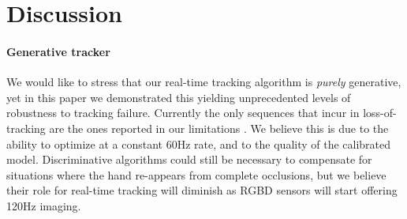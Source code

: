 \section{Discussion}
\label{sec:discussion}




\paragraph{Generative tracker}
We would like to stress that our real-time tracking algorithm is \emph{purely} generative, yet in this paper we demonstrated this yielding unprecedented levels of robustness to tracking failure. Currently the only sequences that incur in loss-of-tracking are the ones reported in our limitations \VideoLimit{}. We believe this is due to the ability to optimize at a constant 60Hz rate, and to the quality of the calibrated model. Discriminative algorithms could still be necessary to compensate for situations where the hand re-appears from complete occlusions, but we believe their role for real-time tracking will diminish as RGBD sensors will start offering 120Hz imaging.  


